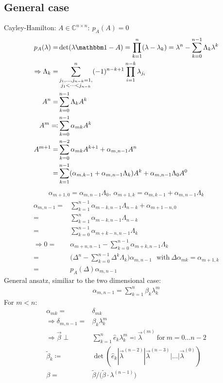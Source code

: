 \documentclass[12pt]{article}
\begin{document}
\subsection{General case}\label{ch:math.general case}
Cayley-Hamilton: $A \in \mathbb C^{n\times n}:\ p_A(A) = 0$
\begin{align}
p_A(\lambda) =& \det(\lambda\mathbbm 1 - A) = \prod_{k=1}^n(\lambda - \lambda_k) = \lambda^n - \sum_{k=0}^{n-1} \Lambda_k \lambda^k\nonumber\\
\Rightarrow \Lambda_k =& \sum_{\substack{j_1,\dots,j_{n-k} = 1,\\ j_1<\dots<j_{n-k}}}^n (-1)^{n-k+1} \prod_{i=1}^{n-k} \lambda_{j_i} \\
A^n =& \sum_{k=0}^{n-1} \Lambda_k A^k\nonumber\\
A^m \eqqcolon& \sum_{k=0}^{n-1} \alpha_{mk} A^k\\
A^{m+1} =& \sum_{k=0}^{n-2} \alpha_{mk} A^{k+1} + \alpha_{m,n-1} A^n \nonumber\\
=& \sum_{k=1}^{n-1} (\alpha_{m,k-1} + \alpha_{m,n-1}\Lambda_k) A^k + \alpha_{m,n-1}\Lambda_0 A^0 \nonumber\\
\end{align}
\begin{align}
\alpha_{m+1,0} = \alpha_{m,n-1} \Lambda_0,\ \alpha_{m+1,k} = \alpha_{m,k-1} + \alpha_{m,n-1}\Lambda_k \label{recurrent ndim}
\end{align}
\begin{align}
\alpha_{m,n-1} =& \sum_{k=1}^{n-1} \alpha_{m-k,n-1}\Lambda_{n-k} + \alpha_{m+1-n,0} \nonumber\\
=& \sum_{k=1}^n \alpha_{m-k,n-1}\Lambda_{n-k} \nonumber\\
=& \sum_{k=0}^{n-1} \alpha_{m+k-n,n-1}\Lambda_k\\
\Rightarrow 0=& \alpha_{m+n,n-1} - \sum_{k=0}^{n-1} \alpha_{m+k,n-1}\Lambda_k \nonumber\\
=& \big( \Delta^n - \sum_{k=0}^{n-1} \Delta^k \Lambda_k \big) \alpha_{m, n-1} \ \ \ \text{with}\ \Delta \alpha_{mk} = \alpha_{m+1,k}\nonumber\\
=& p_A(\Delta) \alpha_{m, n-1}
\end{align}
General ansatz, similiar to the two dimensional case:
\begin{align}
\alpha_{m,n-1} = \sum_{k=1}^n \beta_k \lambda_k^m
\end{align}
For $m<n$:
\begin{align}
\alpha_{mk} =& \delta_{mk}\\
\Rightarrow \delta_{m,n-1} =& \beta_k \lambda_k^m\\
\Rightarrow \vec \beta \perp& \sum_{k=1}^n \hat e_k \lambda_k^m \eqqcolon \vec \lambda^{(m)} \ \text{for}\ m=0\dots n-2\\
\tilde\beta_k \coloneqq& \det(\hat e_k | \vec\lambda^{(n-2)} | \vec\lambda^{(n-3)} | \dots | \vec\lambda^{(0)})\nonumber\\
\beta =& \tilde\beta /\big( \tilde \beta \cdot \lambda^{(n-1)} \big)
\end{align}
\end{document}
